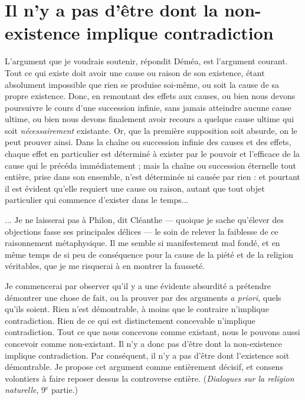 
\section{Il n'y a pas d'être dont la non-existence implique contradiction}

L’argument que je voudrais soutenir, répondit Déméa,
est l’argument courant. Tout ce qui existe doit avoir
une cause ou raison de son existence, étant absolument
impossible que rien se produise soi-même, ou soit la cause
de sa propre existence. Donc, en remontant des effets aux
causes, ou bien nous devons poursuivre le cours d’une
succession infinie, sans jamais atteindre aucune cause
ultime, ou bien nous devons finalement avoir recours a
quelque cause ultime qui soit {\it nécessairement} existante. Or,
que la première supposition soit absurde, on le peut
prouver ainsi. Dans la chaîne ou succession infinie des
causes et des effets, chaque effet en particulier est déterminé
à exister par le pouvoir et l'efficace de la cause qui le
précéda immédiatement ; mais la chaîne ou succession
éternelle tout entière, prise dans son ensemble, n’est
déterminée ni causée par rien : et pourtant il est évident
qu’elle requiert une cause ou raison, autant que
tout objet particulier qui commence d’exister dans le
temps...

... Je ne laisserai pas à Philon, dit Cléanthe — quoique
je sache qu’élever des objections fasse ses principales
délices — le soin de relever la faiblesse de ce raisonnement
métaphysique. Il me semble si manifestement mal fondé,
et en même temps de si peu de conséquence pour la cause
de la piété et de la religion véritables, que je me risquerai
à en montrer la fausseté.

Je commencerai par observer qu’il y a une évidente
absurdité a prétendre démontrer une chose de fait,
ou la prouver par des arguments {\it a priori}, quels qu’ils
soient. Rien n’est démontrable, à moins que le contraire
n’implique contradiction. Rien de ce qui est distinctement
concevable n’implique contradiction. Tout ce que
nous concevons comme existant, nous le pouvons aussi
concevoir comme non-existant. Il n’y a donc pas d’être
dont la non-existence implique contradiction. Par conséquent,
il n’y a pas d’être dont l’existence soit démontrable.
Je propose cet argument comme entièrement
décisif, et consens volontiers à faire reposer dessus la
controverse entière. ({\it Dialogues sur la religion naturelle},
9$^\text{e}$ partie.)


